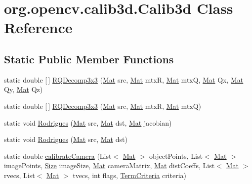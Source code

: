 \hypertarget{classorg_1_1opencv_1_1calib3d_1_1_calib3d}{}\section{org.\+opencv.\+calib3d.\+Calib3d Class Reference}
\label{classorg_1_1opencv_1_1calib3d_1_1_calib3d}
\subsection*{Static Public Member Functions}
\begin{DoxyCompactItemize}
\item 
static double \mbox{[}$\,$\mbox{]} \mbox{\hyperlink{classorg_1_1opencv_1_1calib3d_1_1_calib3d_a25a9a7350da241cac233a16419ad3ebd}{R\+Q\+Decomp3x3}} (\mbox{\hyperlink{classorg_1_1opencv_1_1core_1_1_mat}{Mat}} src, \mbox{\hyperlink{classorg_1_1opencv_1_1core_1_1_mat}{Mat}} mtxR, \mbox{\hyperlink{classorg_1_1opencv_1_1core_1_1_mat}{Mat}} mtxQ, \mbox{\hyperlink{classorg_1_1opencv_1_1core_1_1_mat}{Mat}} Qx, \mbox{\hyperlink{classorg_1_1opencv_1_1core_1_1_mat}{Mat}} Qy, \mbox{\hyperlink{classorg_1_1opencv_1_1core_1_1_mat}{Mat}} Qz)
\item 
static double \mbox{[}$\,$\mbox{]} \mbox{\hyperlink{classorg_1_1opencv_1_1calib3d_1_1_calib3d_a954aae0c68e0109ce75ebe6bb897eb19}{R\+Q\+Decomp3x3}} (\mbox{\hyperlink{classorg_1_1opencv_1_1core_1_1_mat}{Mat}} src, \mbox{\hyperlink{classorg_1_1opencv_1_1core_1_1_mat}{Mat}} mtxR, \mbox{\hyperlink{classorg_1_1opencv_1_1core_1_1_mat}{Mat}} mtxQ)
\item 
static void \mbox{\hyperlink{classorg_1_1opencv_1_1calib3d_1_1_calib3d_a922c174e8c7e4564831abdb4ba8ba2dc}{Rodrigues}} (\mbox{\hyperlink{classorg_1_1opencv_1_1core_1_1_mat}{Mat}} src, \mbox{\hyperlink{classorg_1_1opencv_1_1core_1_1_mat}{Mat}} dst, \mbox{\hyperlink{classorg_1_1opencv_1_1core_1_1_mat}{Mat}} jacobian)
\item 
static void \mbox{\hyperlink{classorg_1_1opencv_1_1calib3d_1_1_calib3d_a5b382445df7c31a34f6fabe2c7a404b3}{Rodrigues}} (\mbox{\hyperlink{classorg_1_1opencv_1_1core_1_1_mat}{Mat}} src, \mbox{\hyperlink{classorg_1_1opencv_1_1core_1_1_mat}{Mat}} dst)
\item 
static double \mbox{\hyperlink{classorg_1_1opencv_1_1calib3d_1_1_calib3d_abb2da586f9e7234fede7598a15426bfa}{calibrate\+Camera}} (List$<$ \mbox{\hyperlink{classorg_1_1opencv_1_1core_1_1_mat}{Mat}} $>$ object\+Points, List$<$ \mbox{\hyperlink{classorg_1_1opencv_1_1core_1_1_mat}{Mat}} $>$ image\+Points, \mbox{\hyperlink{classorg_1_1opencv_1_1core_1_1_size}{Size}} image\+Size, \mbox{\hyperlink{classorg_1_1opencv_1_1core_1_1_mat}{Mat}} camera\+Matrix, \mbox{\hyperlink{classorg_1_1opencv_1_1core_1_1_mat}{Mat}} dist\+Coeffs, List$<$ \mbox{\hyperlink{classorg_1_1opencv_1_1core_1_1_mat}{Mat}} $>$ rvecs, List$<$ \mbox{\hyperlink{classorg_1_1opencv_1_1core_1_1_mat}{Mat}} $>$ tvecs, int flags, \mbox{\hyperlink{classorg_1_1opencv_1_1core_1_1_term_criteria}{Term\+Criteria}} criteria)

\end{DoxyCompactItemize}
